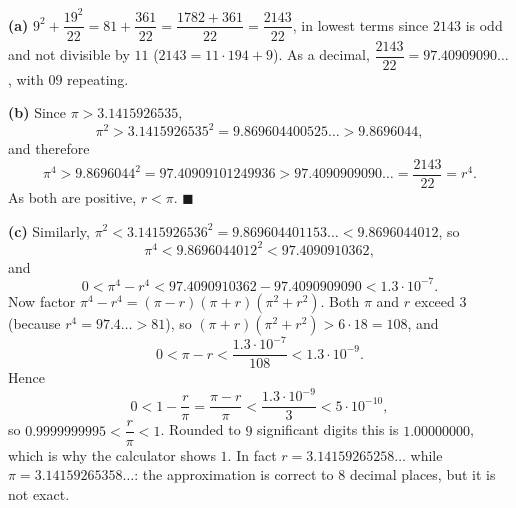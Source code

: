 \textbf{(a)} $9^2+\dfrac{19^2}{22}=81+\dfrac{361}{22}=\dfrac{1782+361}{22}=\boxed{\dfrac{2143}{22}}$, in lowest terms since $2143$ is odd and not divisible by $11$ ($2143=11\cdot194+9$). As a decimal, $\dfrac{2143}{22}=97.40909090\ldots$, with $09$ repeating.

\textbf{(b)} Since $\pi>3.1415926535$,
\[\pi^2>3.1415926535^2=9.869604400525\ldots>9.8696044,\]
and therefore
\[\pi^4>9.8696044^2=97.40909101249936>97.4090909090\ldots=\dfrac{2143}{22}=r^4.\]
As both are positive, $r<\pi$. $\blacksquare$

\textbf{(c)} Similarly, $\pi^2<3.1415926536^2=9.869604401153\ldots<9.8696044012$, so
\[\pi^4<9.8696044012^2<97.4090910362,\]
and
\[0<\pi^4-r^4<97.4090910362-97.4090909090<1.3\cdot10^{-7}.\]
Now factor $\pi^4-r^4=(\pi-r)(\pi+r)\left(\pi^2+r^2\right)$. Both $\pi$ and $r$ exceed $3$ (because $r^4=97.4\ldots>81$), so $(\pi+r)\left(\pi^2+r^2\right)>6\cdot18=108$, and
\[0<\pi-r<\dfrac{1.3\cdot10^{-7}}{108}<1.3\cdot10^{-9}.\]
Hence
\[0<1-\dfrac r\pi=\dfrac{\pi-r}{\pi}<\dfrac{1.3\cdot10^{-9}}{3}<5\cdot10^{-10},\]
so $0.9999999995<\dfrac r\pi<1$. Rounded to $9$ significant digits this is $1.00000000$, which is why the calculator shows $1$. In fact $r=3.14159265258\ldots$ while $\pi=3.14159265358\ldots$: the approximation is correct to $8$ decimal places, but it is not exact.
